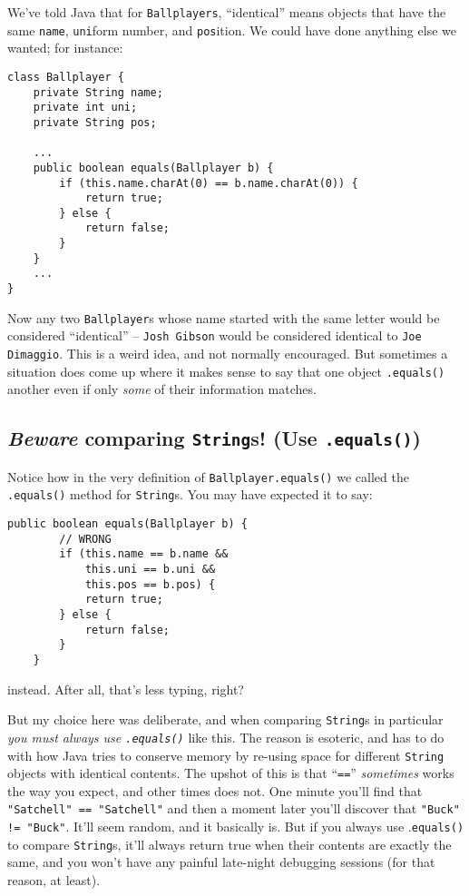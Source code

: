 We've told Java that for \texttt{Ballplayers}, ``identical'' means objects that
have the same \texttt{name}, \texttt{uni}form number, and \texttt{pos}ition.
We could have done anything else we wanted; for instance:

\begin{Verbatim}[fontsize=\footnotesize,samepage=true,frame=single]
class Ballplayer {
    private String name;
    private int uni;
    private String pos;
    
    ...
    public boolean equals(Ballplayer b) {
        if (this.name.charAt(0) == b.name.charAt(0)) {
            return true;
        } else {
            return false;
        }
    }
    ...
}
\end{Verbatim}

Now any two \texttt{Ballplayer}s whose name started with the same letter would
be considered ``identical'' -- \texttt{Josh Gibson} would be considered
identical to \texttt{Joe Dimaggio}. This is a weird idea, and not normally
encouraged. But sometimes a situation does come up where it makes sense to say
that one object \texttt{.equals()} another even if only \textit{some} of their
information matches.

\subsection{\textit{Beware} comparing \texttt{String}s! (Use \texttt{.equals()})}

Notice how in the very definition of \texttt{Ballplayer.equals()} we called
the \texttt{.equals()} method for \texttt{String}s. You may have expected it
to say:

\begin{Verbatim}[fontsize=\scriptsize,samepage=true]
    public boolean equals(Ballplayer b) {
        // WRONG
        if (this.name == b.name &&
            this.uni == b.uni &&
            this.pos == b.pos) {
            return true;
        } else {
            return false;
        }
    }
\end{Verbatim}

instead. After all, that's less typing, right?

But my choice here was deliberate, and when comparing \texttt{String}s in
particular \textit{you must always use \texttt{.equals()}} like this. The
reason is esoteric, and has to do with how Java tries to conserve memory by
re-using space for different \texttt{String} objects with identical contents.
The upshot of this is that ``\texttt{==}'' \textit{sometimes} works the way you
expect, and other times does not. One minute you'll find that
\texttt{"Satchell" == "Satchell"} and then a moment later you'll discover that
\texttt{"Buck" != "Buck"}. It'll seem random, and it basically is. But if you
always use .\texttt{equals()} to compare \texttt{String}s, it'll always return
true when their contents are exactly the same, and you won't have any painful
late-night debugging sessions (for that reason, at least).

